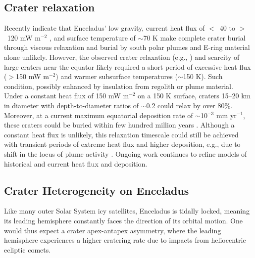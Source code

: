 \documentclass[preprint,11pt,3p,times,authoryear]{elsarticle}
\begin{document}
{\subsection{Crater relaxation}
\label{subsec:relax}
Recently \citet{Bland2012,Martin2023} indicate that Enceladus’ low gravity, current heat flux of $<$~40 to $>$~120 mW m$^{-2}$ \citep{Cadek2019,Kinczyk2024}, and surface temperature of $\sim$70 K make complete crater burial through viscous relaxation and burial by south polar plumes and E-ring material alone unlikely. However, the observed crater relaxation (e.g., \citealt{Bland2012}) and scarcity of large craters near the equator likely required a short period of excessive heat flux ($>$150 mW m$^{-2}$) and warmer subsurface temperatures ($\sim$150 K). Such condition, possibly enhanced by insulation from regolith or plume material. Under a constant heat flux of 150 mW m$^{-2}$ on a 150 K surface, craters 15–20 km in diameter with depth-to-diameter ratios of $\sim$0.2 could relax by over 80\%. Moreover, at a current maximum equatorial deposition rate of $\sim$10$^{-3}$ mm yr$^{-1}$, these craters could be buried within few hundred million years \citep{Bland2012}. Although a constant heat flux is unlikely, this relaxation timescale could still be achieved with transient periods of extreme heat flux and higher deposition, e.g., due to shift in the locus of plume activity \citep{Bland2012}. Ongoing work continues to refine models of historical and current heat flux and deposition.


\subsection{Crater Heterogeneity on Enceladus}
\label{sub:hetero}
Like many outer Solar System icy satellites, Enceladus is tidally locked, meaning its leading hemisphere constantly faces the direction of its orbital motion. One would thus expect a crater apex-antapex asymmetry, where the leading hemisphere experiences a higher cratering rate due to impacts from heliocentric ecliptic comets.\\

}
\end{document}
